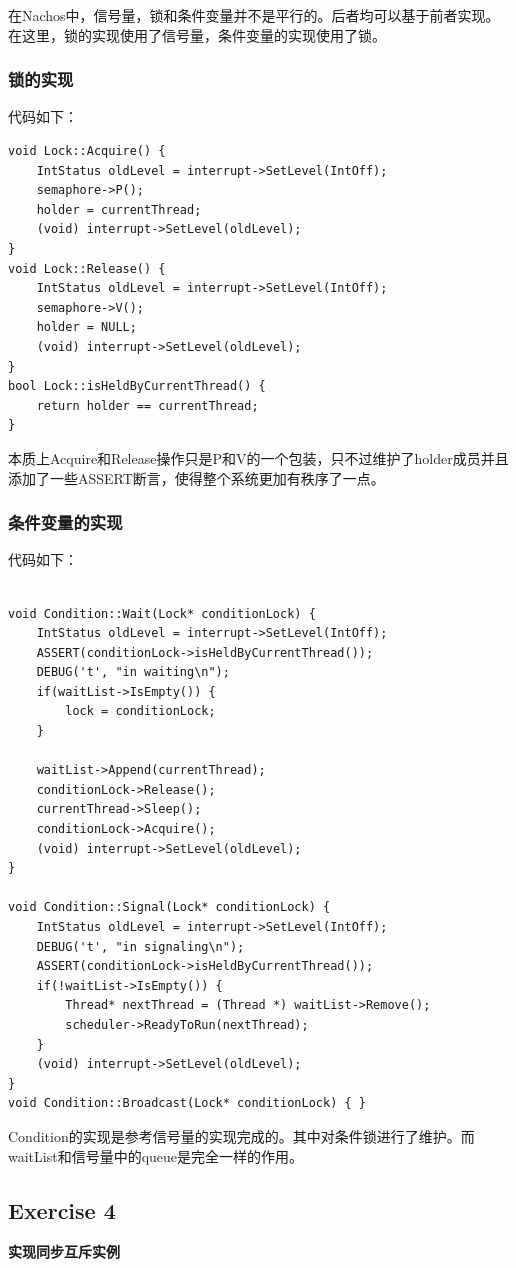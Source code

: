 \documentclass{ctexart}
\begin{document}
在Nachos中，信号量，锁和条件变量并不是平行的。后者均可以基于前者实现。在这里，锁的实现使用了信号量，条件变量的实现使用了锁。

\subsubsection*{锁的实现}
代码如下：
\begin{lstlisting}
void Lock::Acquire() {
    IntStatus oldLevel = interrupt->SetLevel(IntOff);
    semaphore->P();
    holder = currentThread;
    (void) interrupt->SetLevel(oldLevel);
}
void Lock::Release() {
    IntStatus oldLevel = interrupt->SetLevel(IntOff);
    semaphore->V();
    holder = NULL;
    (void) interrupt->SetLevel(oldLevel);
}
bool Lock::isHeldByCurrentThread() {
    return holder == currentThread;
}
\end{lstlisting}
本质上Acquire和Release操作只是P和V的一个包装，只不过维护了holder成员并且添加了一些ASSERT断言，使得整个系统更加有秩序了一点。

\subsubsection*{条件变量的实现}
代码如下：
\begin{lstlisting}

void Condition::Wait(Lock* conditionLock) { 
    IntStatus oldLevel = interrupt->SetLevel(IntOff);
    ASSERT(conditionLock->isHeldByCurrentThread());
    DEBUG('t', "in waiting\n");
    if(waitList->IsEmpty()) {
        lock = conditionLock;
    }

    waitList->Append(currentThread);
    conditionLock->Release();
    currentThread->Sleep();
    conditionLock->Acquire();
    (void) interrupt->SetLevel(oldLevel);
}

void Condition::Signal(Lock* conditionLock) { 
    IntStatus oldLevel = interrupt->SetLevel(IntOff);
    DEBUG('t', "in signaling\n");
    ASSERT(conditionLock->isHeldByCurrentThread());
    if(!waitList->IsEmpty()) {
        Thread* nextThread = (Thread *) waitList->Remove();
        scheduler->ReadyToRun(nextThread);
    }
    (void) interrupt->SetLevel(oldLevel);
}
void Condition::Broadcast(Lock* conditionLock) { }

\end{lstlisting}
Condition的实现是参考信号量的实现完成的。其中对条件锁进行了维护。而waitList和信号量中的queue是完全一样的作用。

\subsection*{Exercise 4}
\textbf{实现同步互斥实例}
\end{document}

